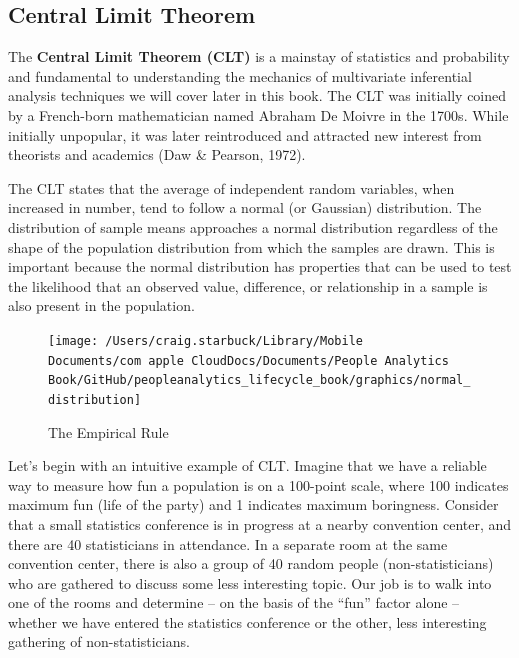 \documentclass[]{book}
\begin{document}
\hypertarget{central-limit-theorem}{%
\subsection{Central Limit Theorem}\label{central-limit-theorem}}

The \textbf{Central Limit Theorem (CLT)} is a mainstay of statistics and probability and fundamental to understanding the mechanics of multivariate inferential analysis techniques we will cover later in this book. The CLT was initially coined by a French-born mathematician named Abraham De Moivre in the 1700s. While initially unpopular, it was later reintroduced and attracted new interest from theorists and academics (Daw \& Pearson, 1972).

The CLT states that the average of independent random variables, when increased in number, tend to follow a normal (or Gaussian) distribution. The distribution of sample means approaches a normal distribution regardless of the shape of the population distribution from which the samples are drawn. This is important because the normal distribution has properties that can be used to test the likelihood that an observed value, difference, or relationship in a sample is also present in the population.

\begin{figure}

{\centering \texttt{[image: /Users/craig.starbuck/Library/Mobile Documents/com~apple~CloudDocs/Documents/People Analytics Book/GitHub/peopleanalytics\_lifecycle\_book/graphics/normal\_distribution]} 

}

\caption{The Empirical Rule}\label{fig:emp-rule}
\end{figure}

Let's begin with an intuitive example of CLT. Imagine that we have a reliable way to measure how fun a population is on a 100-point scale, where 100 indicates maximum fun (life of the party) and 1 indicates maximum boringness. Consider that a small statistics conference is in progress at a nearby convention center, and there are 40 statisticians in attendance. In a separate room at the same convention center, there is also a group of 40 random people (non-statisticians) who are gathered to discuss some less interesting topic. Our job is to walk into one of the rooms and determine -- on the basis of the ``fun'' factor alone -- whether we have entered the statistics conference or the other, less interesting gathering of non-statisticians.
\end{document}
